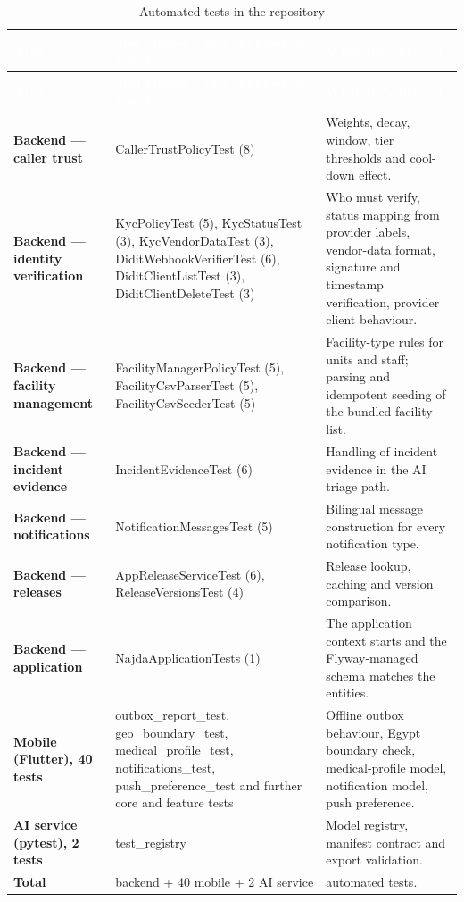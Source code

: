 {\tabfont\rowband
\begin{longtable}{@{}>{\raggedright\arraybackslash}p{}>{\raggedright\arraybackslash}p{}>{\raggedright\arraybackslash}p{}@{}}
\caption{Automated tests in the repository}\label{tab:tests-auto}\\
\rowcolor{najdanavy}\textcolor{white}{\sffamily\bfseries\small Area} & \textcolor{white}{\sffamily\bfseries\small Test classes /\allowbreak{} files (number of tests)} & \textcolor{white}{\sffamily\bfseries\small What they protect}\\
\endfirsthead
\rowcolor{najdanavy}\textcolor{white}{\sffamily\bfseries\small Area} & \textcolor{white}{\sffamily\bfseries\small Test classes /\allowbreak{} files (number of tests)} & \textcolor{white}{\sffamily\bfseries\small What they protect}\\
\endhead
\bottomrule\endlastfoot
\textbf{Backend --- caller trust} & CallerTrustPolicyTest (8) & Weights, decay, window, tier thresholds and cool-down effect.\\
\textbf{Backend --- identity verification} & KycPolicyTest (5), KycStatusTest (3), KycVendorDataTest (3), DiditWebhookVerifierTest (6), DiditClientListTest (3), DiditClientDeleteTest (3) & Who must verify, status mapping from provider labels, vendor-data format, signature and timestamp verification, provider client behaviour.\\
\textbf{Backend --- facility management} & FacilityManagerPolicyTest (5), FacilityCsvParserTest (5), FacilityCsvSeederTest (5) & Facility-type rules for units and staff; parsing and idempotent seeding of the bundled facility list.\\
\textbf{Backend --- incident evidence} & IncidentEvidenceTest (6) & Handling of incident evidence in the AI triage path.\\
\textbf{Backend --- notifications} & NotificationMessagesTest (5) & Bilingual message construction for every notification type.\\
\textbf{Backend --- releases} & AppReleaseServiceTest (6), ReleaseVersionsTest (4) & Release lookup, caching and version comparison.\\
\textbf{Backend --- application} & NajdaApplicationTests (1) & The application context starts and the Flyway-managed schema matches the entities.\\
\textbf{Mobile (Flutter), 40 tests} & outbox\_\allowbreak{}report\_\allowbreak{}test, geo\_\allowbreak{}boundary\_\allowbreak{}test, medical\_\allowbreak{}profile\_\allowbreak{}test, notifications\_\allowbreak{}test, push\_\allowbreak{}preference\_\allowbreak{}test and further core and feature tests & Offline outbox behaviour, Egypt boundary check, medical-profile model, notification model, push preference.\\
\textbf{AI service (pytest), 2 tests} & test\_\allowbreak{}registry & Model registry, manifest contract and export validation.\\
\textbf{Total} & 68 backend + 40 mobile + 2 AI service & 110 automated tests.\\
\end{longtable}}